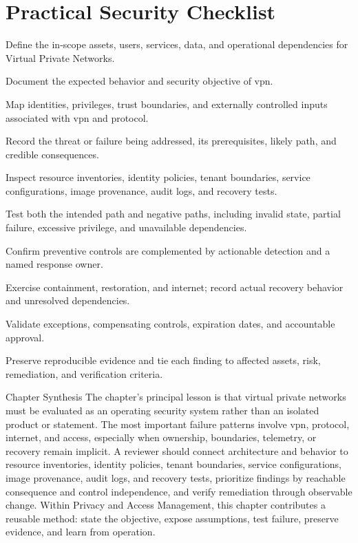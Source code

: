 \documentclass[11pt,letterpaper]{article}
\begin{document}
\section*{Practical Security Checklist}
\begin{CornellChecklist}
\item Define the in-scope assets, users, services, data, and operational dependencies for Virtual Private Networks.
\item Document the expected behavior and security objective of vpn.
\item Map identities, privileges, trust boundaries, and externally controlled inputs associated with vpn and protocol.
\item Record the threat or failure being addressed, its prerequisites, likely path, and credible consequences.
\item Inspect resource inventories, identity policies, tenant boundaries, service configurations, image provenance, audit logs, and recovery tests.
\item Test both the intended path and negative paths, including invalid state, partial failure, excessive privilege, and unavailable dependencies.
\item Confirm preventive controls are complemented by actionable detection and a named response owner.
\item Exercise containment, restoration, and internet; record actual recovery behavior and unresolved dependencies.
\item Validate exceptions, compensating controls, expiration dates, and accountable approval.
\item Preserve reproducible evidence and tie each finding to affected assets, risk, remediation, and verification criteria.
\end{CornellChecklist}
\begin{CornellSummaryBox}{Chapter Synthesis}
The chapter's principal lesson is that virtual private networks must be evaluated as an operating security system rather than an isolated product or statement. The most important failure patterns involve vpn, protocol, internet, and access, especially when ownership, boundaries, telemetry, or recovery remain implicit. A reviewer should connect architecture and behavior to resource inventories, identity policies, tenant boundaries, service configurations, image provenance, audit logs, and recovery tests, prioritize findings by reachable consequence and control independence, and verify remediation through observable change. Within Privacy and Access Management, this chapter contributes a reusable method: state the objective, expose assumptions, test failure, preserve evidence, and learn from operation.
\end{CornellSummaryBox}
\end{document}

